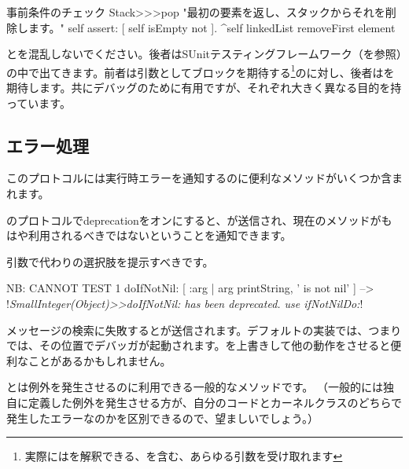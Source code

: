 \documentclass[a4paper,10pt,twoside]{book}
\begin{document}
\begin{method}{事前条件のチェック}
Stack>>>pop
    "最初の要素を返し、スタックからそれを削除します。"
    self assert: [ self isEmpty not ].
    ^self linkedList removeFirst element
\end{method}

とを混乱しないでください。後者はSUnitテスティングフレームワーク（を参照）の中で出てきます。前者は引数としてブロックを期待する\footnote{実際にはを解釈できる、を含む、あらゆる引数を受け取れます}のに対し、後者はを期待します。共にデバッグのために有用ですが、それぞれ大きく異なる目的を持っています。

\subsection{エラー処理}

このプロトコルには実行時エラーを通知するのに便利なメソッドがいくつか含まれます。

のプロトコルでdeprecationをオンにすると、が送信され、現在のメソッドがもはや利用されるべきではないということを通知できます。

引数で代わりの選択肢を提示すべきです。

\begin{code}{NB: CANNOT TEST}
1 doIfNotNil: [ :arg | arg printString, ' is not nil' ]
  --> !\emph{SmallInteger(Object)>>doIfNotNil: has been deprecated. use ifNotNilDo:}!
\end{code}

メッセージの検索に失敗するとが送信されます。デフォルトの実装では、\ie つまりでは、その位置でデバッガが起動されます。を上書きして他の動作をさせると便利なことがあるかもしれません。


とは例外を発生させるのに利用できる一般的なメソッドです。
（一般的には独自に定義した例外を発生させる方が、自分のコードとカーネルクラスのどちらで発生したエラーなのかを区別できるので、望ましいでしょう。）
\end{document}
